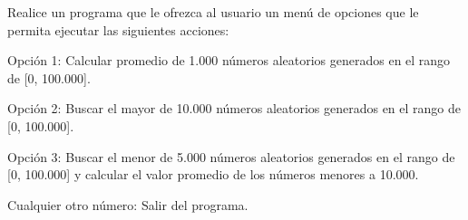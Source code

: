Realice un programa que le ofrezca al usuario un menú de opciones que le permita ejecutar las siguientes acciones:

\bigskip
Opción 1: Calcular promedio de 1.000 números aleatorios generados en el rango de [0, 100.000].

Opción 2: Buscar el mayor de 10.000 números aleatorios generados en el rango de [0, 100.000].

Opción 3: Buscar el menor de 5.000 números aleatorios generados en el rango de [0, 100.000] y calcular el valor promedio de los números menores a 10.000.

\bigskip
Cualquier otro número: Salir del programa.

